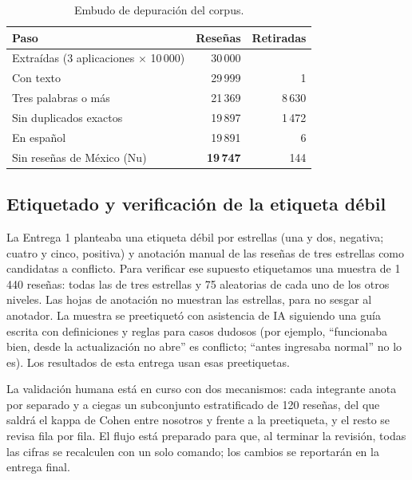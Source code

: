\documentclass[11pt,a4paper]{article}
\newif\ifborrador
\begin{document}
\begin{table}[h]
\centering\small
\caption{Embudo de depuración del corpus.}\label{tab:embudo}
\begin{tabular}{lrr}
\toprule
Paso & Reseñas & Retiradas \\
\midrule
Extraídas (3 aplicaciones $\times$ 10\,000) & 30\,000 & \\
Con texto & 29\,999 & 1 \\
Tres palabras o más & 21\,369 & 8\,630 \\
Sin duplicados exactos & 19\,897 & 1\,472 \\
En español & 19\,891 & 6 \\
Sin reseñas de México (Nu) & \textbf{19\,747} & 144 \\
\bottomrule
\end{tabular}
\end{table}

\subsection{Etiquetado y verificación de la etiqueta débil}
La Entrega 1 planteaba una etiqueta débil por estrellas (una y dos, negativa; cuatro y cinco,
positiva) y anotación manual de las reseñas de tres estrellas como candidatas a conflicto. Para
verificar ese supuesto etiquetamos una muestra de 1\,440 reseñas: todas las de tres estrellas
y 75 aleatorias de cada uno de los otros niveles. Las hojas de anotación no muestran las estrellas,
para no sesgar al anotador. La muestra se preetiquetó con asistencia de IA siguiendo una guía escrita
con definiciones y reglas para casos dudosos (por ejemplo, ``funcionaba bien, desde la
actualización no abre'' es conflicto; ``antes ingresaba normal'' no lo es). Los resultados de esta
entrega usan esas preetiquetas.
\ifborrador
Para medir su confiabilidad, cada integrante anotó por separado y a ciegas un subconjunto
estratificado de 120 reseñas, sin ver las estrellas ni la preetiqueta. El kappa de Cohen entre
nosotros fue de 0,63, con un acuerdo simple del 82\,\%, y el de cada uno frente a la preetiqueta
asistida fue de 0,84 y 0,74. Los 22 desacuerdos, concentrados casi todos en la frontera entre
negativa y conflicto, se resolvieron por consenso. El resto de la muestra se revisó fila por fila.
\else
La validación humana está en curso con dos mecanismos: cada
integrante anota por separado y a ciegas un subconjunto estratificado de 120 reseñas, del que
saldrá el kappa de Cohen entre nosotros y frente a la preetiqueta, y el resto se revisa fila por
fila. El flujo está preparado para que, al terminar la revisión, todas las cifras se recalculen
con un solo comando; los cambios se reportarán en la entrega final.
\fi
\end{document}

